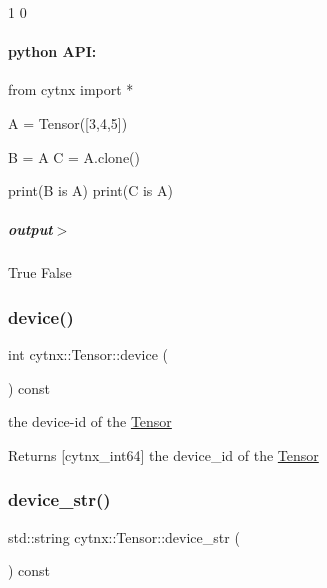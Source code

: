 \begin{DoxyVerbInclude}
1
0
\end{DoxyVerbInclude}
 \paragraph*{python A\+PI\+:}


\begin{DoxyCodeInclude}
\textcolor{keyword}{from} cytnx \textcolor{keyword}{import} *

A = Tensor([3,4,5])

B = A
C = A.clone()

print(B \textcolor{keywordflow}{is} A)
print(C \textcolor{keywordflow}{is} A)

\end{DoxyCodeInclude}
 \subparagraph*{output$>$}


\begin{DoxyVerbInclude}
True
False
\end{DoxyVerbInclude}
 \mbox{\label{classcytnx_1_1Tensor_ac6d3310eb4defbdacf662dcd81d8fe09}} 
\subsubsection{\texorpdfstring{device()}{device()}}
{\footnotesize\ttfamily int cytnx\+::\+Tensor\+::device (\begin{DoxyParamCaption}{ }\end{DoxyParamCaption}) const\hspace{0.3cm}{\ttfamily [inline]}}



the device-\/id of the \hyperlink{classcytnx_1_1Tensor}{Tensor} 

\begin{DoxyReturn}{Returns}
\mbox{[}cytnx\+\_\+int64\mbox{]} the device\+\_\+id of the \hyperlink{classcytnx_1_1Tensor}{Tensor} 
\end{DoxyReturn}
\mbox{\label{classcytnx_1_1Tensor_a335f7625fa01784f49b2223238d0c14e}} 
\subsubsection{\texorpdfstring{device\+\_\+str()}{device\_str()}}
{\footnotesize\ttfamily std\+::string cytnx\+::\+Tensor\+::device\+\_\+str (\begin{DoxyParamCaption}{ }\end{DoxyParamCaption}) const\hspace{0.3cm}{\ttfamily [inline]}}




